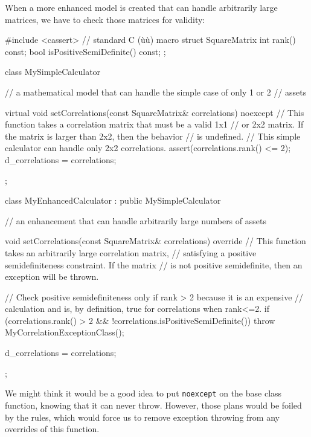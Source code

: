 When a more enhanced model is created that can handle arbitrarily large
matrices, we have to check those matrices for validity:

\begin{emcppshiddenlisting}[emcppsbatch=e30]
#include <cassert>  // standard C (ù{}ù) macro
struct SquareMatrix{
    int rank() const;
    bool isPositiveSemiDefinite() const;
};
\end{emcppshiddenlisting}
\begin{emcppslisting}[emcppsbatch=e30,emcppserrorlines={14,31,34},emcppsignore={too broken to fix}]
class MySimpleCalculator
{

    // a mathematical model that can handle the simple case of only 1 or 2
    // assets

    virtual void setCorrelations(const SquareMatrix& correlations) noexcept
        // This function takes a correlation matrix that must be a valid 1x1
        // or 2x2 matrix.  If the matrix is larger than 2x2, then the behavior
        // is undefined.
    {
        // This simple calculator can handle only 2x2 correlations.
        assert(correlations.rank() <= 2);
        d_correlations = correlations;
    }
};

class MyEnhancedCalculator : public MySimpleCalculator
{
    // an enhancement that can handle arbitrarily large numbers of assets

    void setCorrelations(const SquareMatrix& correlations) override
        // This function takes an arbitrarily large correlation matrix,
        // satisfying a positive semidefiniteness constraint.  If the matrix
        // is not positive semidefinite, then an exception will be thrown.
    {
        // Check positive semidefiniteness only if rank > 2 because it is an expensive
        // calculation and is, by definition, true for correlations when rank<=2.
        if (correlations.rank() > 2 && !correlations.isPositiveSemiDefinite())
        {
            throw MyCorrelationExceptionClass();
        }

        d_correlations = correlations;
    }
};
\end{emcppslisting}
    

\noindent We might think it would be a good idea to put \lstinline!noexcept! on the
base class function, knowing that it can never throw. However, those
plans would be foiled by the rules, which would force us to remove
exception throwing from any overrides of this function.

